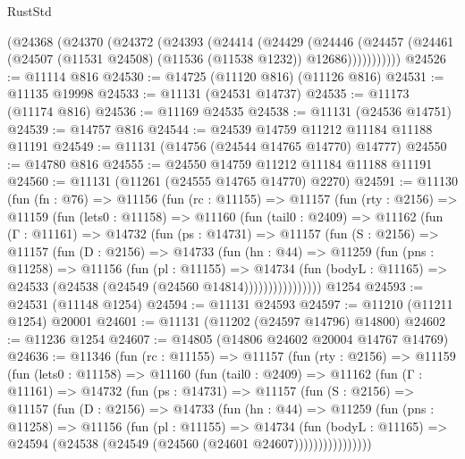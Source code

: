 \begin{lexlean}{RustStd}
\begin{coremodule}
      (@24368
        (@24370
          (@24372
            (@24393
              (@24414
                (@24429
                  (@24446
                    (@24457
                      (@24461 (@24507 (@11531 @24508) (@11536 (@11538 @1232)) @12686)))))))))))
@24526 := @11114 @816
@24530 := @14725 (@11120 @816) (@11126 @816)
@24531 := @11135 @19998
@24533 := @11131 (@24531 @14737)
@24535 := @11173 (@11174 @816)
@24536 := @11169 @24535
@24538 := @11131 (@24536 @14751)
@24539 := @14757 @816
@24544 := @24539 @14759 @11212 @11184 @11188 @11191
@24549 := @11131 (@14756 (@24544 @14765 @14770) @14777)
@24550 := @14780 @816
@24555 := @24550 @14759 @11212 @11184 @11188 @11191
@24560 := @11131 (@11261 (@24555 @14765 @14770) @2270)
@24591 := @11130
    (fun (fn : @76) =>
    @11156
      (fun (rc : @11155) =>
      @11157
        (fun (rty : @2156) =>
        @11159
          (fun (lets0 : @11158) =>
          @11160
            (fun (tail0 : @2409) =>
            @11162
              (fun (Γ : @11161) =>
              @14732
                (fun (ps : @14731) =>
                @11157
                  (fun (S : @2156) =>
                  @11157
                    (fun (D : @2156) =>
                    @14733
                      (fun (hn : @44) =>
                      @11259
                        (fun (pns : @11258) =>
                        @11156
                          (fun (pl : @11155) =>
                          @14734
                            (fun (bodyL : @11165) =>
                            @24533 (@24538 (@24549 (@24560 @14814))))))))))))))))
    @1254
@24593 := @24531 (@11148 @1254)
@24594 := @11131 @24593
@24597 := @11210 (@11211 @1254) @20001
@24601 := @11131 (@11202 (@24597 @14796) @14800)
@24602 := @11236 @1254
@24607 := @14805 (@14806 @24602 @20004 @14767 @14769)
@24636 := @11346
    (fun (rc : @11155) =>
    @11157
      (fun (rty : @2156) =>
      @11159
        (fun (lets0 : @11158) =>
        @11160
          (fun (tail0 : @2409) =>
          @11162
            (fun (Γ : @11161) =>
            @14732
              (fun (ps : @14731) =>
              @11157
                (fun (S : @2156) =>
                @11157
                  (fun (D : @2156) =>
                  @14733
                    (fun (hn : @44) =>
                    @11259
                      (fun (pns : @11258) =>
                      @11156
                        (fun (pl : @11155) =>
                        @14734
                          (fun (bodyL : @11165) =>
                          @24594 (@24538 (@24549 (@24560 (@24601 @24607))))))))))))))))

\end{coremodule}
\end{lexlean}
